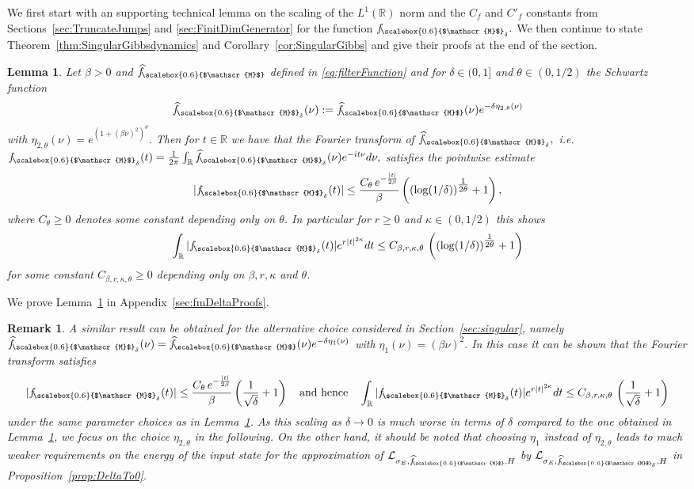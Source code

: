 \documentclass[11pt]{amsart}
\newcommand{\1}{\mathbbm{1}}
\newcommand{\R}{\mathbb{R}}
\newcommand{\cL}{\mathcal{L}}
\newcommand{\hatfM}{\widehat{f}_{\!\scalebox{0.6}{$\mathscr{M}$}}
}
\newcommand{\hatfMdelta}{\widehat{f}_{\!\scalebox{0.6}{$\mathscr{M}$}_\delta}}
\newcommand{\fMdelta}{f_{\!\scalebox{0.6}{$\mathscr{M}$}_\delta}}
\theoremstyle{plain}
\newtheorem{lemma}[theorem]{Lemma}
\newtheorem{remark}[theorem]{Remark}
\theoremstyle{definition}
\theoremstyle{remark}
\numberwithin{equation}{section}
\begin{document}
We first start with an supporting technical lemma on the scaling of the $L^1(\R)$ norm and the $C_f$ and $C'_f$ constants from Sections~\ref{sec:TruncateJumps} and \ref{sec:FinitDimGenerator} for the function $\fMdelta.$
We then continue to 
state Theorem~\ref{thm:SingularGibbsdynamics} and Corollary~\ref{cor:SingularGibbs} and give their proofs at the end of the section.
\begin{lemma}
\label{lem:C_fMdeltaBounds}
Let $\beta>0$ and $\hatfM$ defined in \eqref{eq:filterFunction} and for $\delta\in(0,1]$ and $\theta\in(0,1/2)$ the Schwartz function
\begin{align}\label{hatfMdeltaeq}
    \hatfMdelta(\nu) := \hatfM(\nu)e^{-\delta\eta_{2,\theta}(\nu)}
\end{align}
with $\eta_{2,\theta}(\nu) = e^{(1+(\beta\nu)^2)^\theta}.$  Then for $t\in\R$ we have that the Fourier transform of $\hatfMdelta,$ i.e. $\fMdelta(t) = \frac{1}{2\pi}\int_\R \hatfMdelta(\nu) e^{-it\nu} d\nu,$ satisfies the pointwise estimate 
\begin{align}
\label{eq:fMdeltaPointWise}
    |\fMdelta(t)| \le \frac{C_{\theta}\,e^{-\frac{|t|}{2\beta}}}{\beta}\left(\left(\log(1/\delta)\right)^{\tfrac{1}{2\theta}} +1\right),
\end{align}
where $C_{\theta}\ge 0$ denotes some constant depending only on $\theta$. In particular for $r\ge 0$ and $\kappa\in(0,1/2)$ this shows 
\begin{align}
\label{eq:CfMdeltaBound}
\int_\R |\fMdelta(t)|e^{r|t|^{2\kappa}}dt \le C_{\beta,r,\kappa,\theta}\, \left(\left(\log(1/\delta)\right)^{\tfrac{1}{2\theta}} +1\right)
\end{align}
for some constant $C_{\beta,r,\kappa,\theta}\ge 0$ depending only on $\beta,r,\kappa$ and $\theta$.

\end{lemma}
We prove Lemma~\ref{lem:C_fMdeltaBounds} in Appendix~\ref{sec:fmDeltaProofs}.
\begin{remark}
    A similar result can be obtained for the alternative choice considered in Section~\ref{sec:singular}, namely $\hatfMdelta (\nu) =\hatfM(\nu) e^{-\delta\eta_1(\nu)}$ with $\eta_1(\nu) = (\beta\nu)^2.$ In this case it can be shown that the Fourier transform satisfies
    \begin{align*}
      |\fMdelta(t)| \le \frac{C_{\theta}\,e^{-\frac{|t|}{2\beta}}}{\beta}\left(\frac{1}{\sqrt{\delta}} +1\right)\quad\text{and hence}\quad  \int_\R |\fMdelta(t)|e^{r|t|^{2\kappa}}dt \le C_{\beta,r,\kappa,\theta}\, \left(\frac{1}{\sqrt{\delta}} +1\right)
    \end{align*}
    under the same parameter choices as in Lemma~\ref{lem:C_fMdeltaBounds}. As this scaling as $\delta\to 0$ is  much worse in terms of $\delta$ compared to the one obtained in Lemma~\ref{lem:C_fMdeltaBounds}, we focus on the choice $\eta_{2,\theta}$ in the following. On the other hand, it should be noted that choosing $\eta_1$ instead of $\eta_{2,\theta}$ leads to much weaker requirements on the energy of the input state for the approximation of $\cL_{\sigma_E,\hatfM,H}$ by $\cL_{\sigma_E,\hatfMdelta,H}$ in Proposition~\ref{prop:DeltaTo0}.
\end{remark}
\end{document}
